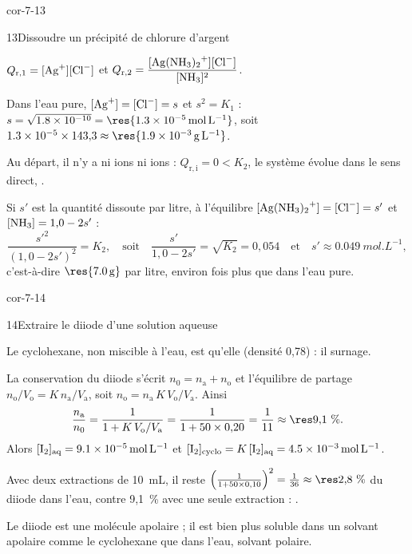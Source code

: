 \begin{blocLivre}{cor-7-13}
\begin{corrige}{13}{Dissoudre un précipité de chlorure d'argent}
\begin{questions}
\item $Q_{\mathrm{r},1}=[\ce{Ag+}][\ce{Cl-}]$ et $Q_{\mathrm{r},2}=\dfrac{[\ce{Ag(NH3)2+}][\ce{Cl-}]}{[\ce{NH3}]^2}$.
\item Dans l'eau pure, $[\ce{Ag+}]=[\ce{Cl-}]=s$ et $s^2=K_1$ : $s=\sqrt{\num{1.8e-10}}=\res{\qty{1,3e-5}{mol.L^{-1}}}$, soit
$\num{1.3e-5}\times143{,}3\approx\res{\qty{1,9e-3}{g.L^{-1}}}$.
\item Au départ, il n'y a ni ions  ni ions  : $Q_{\mathrm{r},\mathrm{i}}=0<K_2$, le système évolue dans le
sens direct, .
\item Si $s'$ est la quantité dissoute par litre, à l'équilibre $[\ce{Ag(NH3)2+}]=[\ce{Cl-}]=s'$ et $[\ce{NH3}]=1{,}0-2s'$ :
\[\frac{s'^2}{(1{,}0-2s')^2}=K_2,\quad\text{soit}\quad\frac{s'}{1{,}0-2s'}=\sqrt{K_2}=0{,}054\quad\text{et}\quad s'\approx\qty{0,049}{mol.L^{-1}},\]
c'est-à-dire $\res{\qty{7,0}{g}}$ par litre, environ  fois plus que dans l'eau pure.
\end{questions}
\end{corrige}
\end{blocLivre}
\begin{blocLivre}{cor-7-14}
\begin{corrige}{14}{Extraire le diiode d'une solution aqueuse}
\begin{questions}
\item Le cyclohexane, non miscible à l'eau, est  qu'elle (densité 0,78) : il surnage.
\item La conservation du diiode s'écrit $n_0=n_\mathrm{a}+n_\mathrm{o}$ et l'équilibre de partage
$n_\mathrm{o}/V_\mathrm{o}=K\,n_\mathrm{a}/V_\mathrm{a}$, soit $n_\mathrm{o}=n_\mathrm{a}\,K\,V_\mathrm{o}/V_\mathrm{a}$. Ainsi
\[\frac{n_\mathrm{a}}{n_0}=\frac{1}{1+K\,V_\mathrm{o}/V_\mathrm{a}}=\frac{1}{1+50\times0{,}20}=\frac{1}{11}\approx\res{9{,}1~\%}.\]
Alors $[\ce{I2}]_\text{aq}=\qty{9,1e-5}{mol.L^{-1}}$ et $[\ce{I2}]_\text{cyclo}=K\,[\ce{I2}]_\text{aq}=\qty{4,5e-3}{mol.L^{-1}}$.
\item Avec deux extractions de 10~mL, il reste $\left(\frac{1}{1+50\times0{,}10}\right)^2=\frac{1}{36}\approx\res{2{,}8~\%}$ du diiode dans
l'eau, contre 9,1~\% avec une seule extraction : .
\item Le diiode est une molécule apolaire ; il est bien plus soluble dans un solvant apolaire comme le cyclohexane que
dans l'eau, solvant polaire.
\end{questions}
\end{corrige}
\end{blocLivre}
